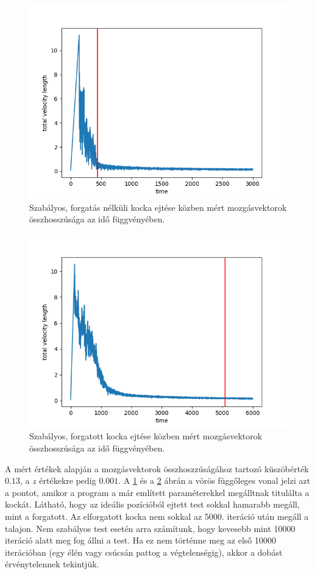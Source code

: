 \begin{figure}[h!]
	\centering
	\includegraphics[scale=0.7]{images/cube_normal_3000.png}
	\caption{Szabályos, forgatás nélküli kocka ejtése közben mért mozgásvektorok összhosszúsága az idő függvényében.}
	\label{fig:cn3000}
\end{figure}
\begin{figure}[h!]
	\centering
	\includegraphics[scale=0.7]{images/cube_rotated_6000.png}
	\caption{Szabályos, forgatott kocka ejtése közben mért mozgásvektorok összhosszúsága az idő függvényében.}
	\label{fig:cr6000}
\end{figure}
A mért értékek alapján a mozgásvektorok összhoszzúságához tartozó küszöbérték $0.13$, a $z$ értékekre pedig $0.001$.
A \ref{fig:cn3000} és a \ref{fig:cr6000} ábrán a vörös függőleges vonal jelzi azt a pontot, amikor a program a már említett paraméterekkel megálltnak titulálta a kockát.
Látható, hogy az ideális pozícióból ejtett test sokkal hamarabb megáll, mint a forgatott.
Az elforgatott kocka nem sokkal az 5000. iteráció után megáll a talajon.
Nem szabályos test esetén arra számítunk, hogy kevesebb mint 10000 iteráció alatt meg fog állni a test.
Ha ez nem történne meg az első 10000 iterációban (egy élén vagy csúcsán pattog a végtelenségig), akkor a dobást érvénytelennek tekintjük.

